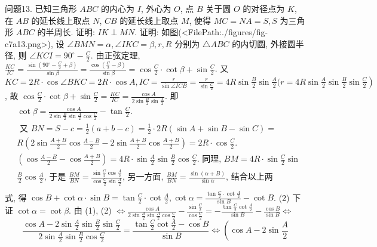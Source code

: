 问题13. 已知三角形 $A B C$ 的内心为 $I$, 外心为 $O$, 点 $B$ 关于圆 $O$ 的对径点为 $K$, 在 $A B$ 的延长线上取点 $N$, $C B$ 的延长线上取点 $M$, 使得 $M C=N A=S, S$ 为三角形 $A B C$ 的半周长.
证明: $I K \perp M N$.
证明: 如图(<FilePath:./figures/fig-c7a13.png>), 设 $\angle B M N=\alpha, \angle I K C=\beta, r, R$ 分别为 $\triangle A B C$ 的内切圆, 外接圆半径, 则 $\angle K C I=90^{\circ}-\frac{C}{2}$.
由正弦定理, $\frac{K C}{I C}=\frac{\sin \left(90^{\circ}-\frac{C}{2}+\beta\right)}{\sin \beta}= \frac{\cos \left(\frac{C}{2}-\beta\right)}{\sin \beta}=\cos \frac{C}{2} \cdot \cot \beta+\sin \frac{C}{2}$. 又 $K C=2 R \cdot \cos \angle B K C=2 R \cdot \cos A, I C=\frac{r}{\sin \angle I C B}=\frac{r}{\sin \frac{C}{2}}=4 R \sin \frac{B}{2} \sin \frac{A}{2}(r=\left.4 R \sin \frac{A}{2} \sin \frac{B}{2} \sin \frac{C}{2}\right)$, 故 $\cos \frac{C}{2} \cdot \cot \beta+\sin \frac{C}{2}=\frac{K C}{I C}=\frac{\cos A}{2 \sin \frac{B}{2} \sin \frac{A}{2}}$. 即
$$
\begin{aligned}
& \cot \beta=\frac{\cos A}{2 \sin \frac{B}{2} \sin \frac{A}{2} \cos \frac{C}{2}}-\tan \frac{C}{2} \text {. } \\
& \text { 又 } B N=S-c=\frac{1}{2}(a+b-c)=\frac{1}{2} \cdot 2 R(\sin A+\sin B-\sin C)= \\
& R\left(2 \sin \frac{A+B}{2} \cos \frac{A-B}{2}-2 \sin \frac{A+B}{2} \cos \frac{A+B}{2}\right)=2 R \cdot \cos \frac{C}{2} \text {. } \\
& \left(\cos \frac{A-B}{2}-\cos \frac{A+B}{2}\right)=4 R \cdot \sin \frac{A}{2} \sin \frac{B}{2} \cos \frac{C}{2} \text {. 同理, } B M=4 R \cdot \sin \frac{C}{2} \sin \\
& \frac{B}{2} \cos \frac{A}{2} \text {, 于是 } \frac{B M}{B N}=\frac{\sin \frac{C}{2} \cos \frac{A}{2}}{\cos \frac{C}{2} \sin \frac{A}{2}} \text {, 另一方面, } \frac{B M}{B N}=\frac{\sin (\alpha+B)}{\sin \alpha} \text {, 结合以上两 } \\
&
\end{aligned}
$$
式, 得 $\cos B+\cot \alpha \cdot \sin B=\tan \frac{C}{2} \cdot \cot \frac{A}{2}, \cot \alpha=\frac{\tan \frac{C}{2} \cdot \cot \frac{A}{2}}{\sin B}-\cot B$. (2)
下证 $\cot \alpha=\cot \beta$.
由 (1), (2) $\Leftrightarrow \frac{\cos A}{2 \sin \frac{B}{2} \sin \frac{A}{2} \cos \frac{C}{2}}-\frac{\sin \frac{C}{2}}{\cos \frac{C}{2}}=-\frac{\tan \frac{C}{2} \cot \frac{A}{2}}{\sin B}-\frac{\cos B}{\sin B} \Leftrightarrow$
$$
\frac{\cos A-2 \sin \frac{A}{2} \sin \frac{B}{2} \sin \frac{C}{2}}{2 \sin \frac{A}{2} \sin \frac{B}{2} \cos \frac{C}{2}}=\frac{\tan \frac{C}{2} \cot \frac{A}{2}-\cos B}{\sin B} \Leftrightarrow\left(\cos A-2 \sin \frac{A}{2}\right.
$$
